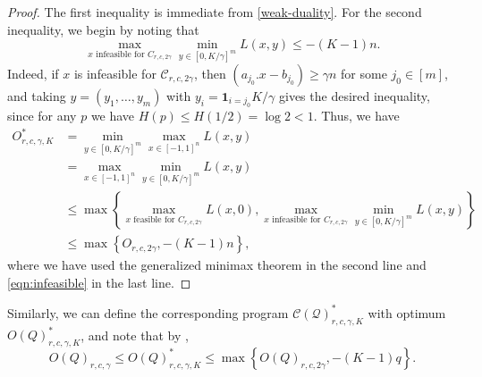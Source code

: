 \documentclass[final, 12pt]{colt2018}
\theoremstyle{definition}
\theoremstyle{plain}
\begin{document}
\begin{proof}
The first inequality is immediate from \cref{weak-duality}. For the second inequality, we begin by noting that  
\begin{equation}
\label{eqn:infeasible}
\max_{x\text{ infeasible for }C_{r,c,2\gamma}}\min_{y\in[0,K/\gamma]^{m}}L(x,y) \leq -(K-1)n.
\end{equation}
Indeed, if $x$ is infeasible for $\mathcal{C}_{r,c,2\gamma}$, then $(a_{j_0}.x - b_{j_0}) \geq \gamma n$ for some $j_0\in[m]$, and taking $y = (y_1,\dots,y_m)$ with $y_i = \textbf{1}_{i=j_0}K/\gamma$ gives the desired inequality, since for any $p$ we have
$H(p) \le H(1/2) = \log 2 < 1$.
Thus, we have
\begin{align*}
O_{r,c,\gamma,K}^{*} & =\min_{y\in[0,K/\gamma]^{m}}\max_{x\in[-1,1]^{n}}L(x,y)\\
 & =\max_{x\in[-1,1]^{n}}\min_{y\in[0,K/\gamma]^{m}}L(x,y)\\
 & \leq\max\left\{ \max_{x\text{ feasible for }C_{r,c,2\gamma}}L(x,0),\max_{x\text{ infeasible for }C_{r,c,2\gamma}}\min_{y\in[0,K/\gamma]^{m}}L(x,y)\right\} \\
 & \leq\max\left\{ O_{r,c,2\gamma},-(K-1)n\right\},
\end{align*}
where we have used the generalized minimax theorem in the second line and \cref{eqn:infeasible} in the last line. 


\end{proof}
Similarly, we can define the corresponding program $\mathcal{C(Q)}^{*}_{r,c,\gamma, K}$ with optimum $O(Q)^{*}_{r,c,\gamma, K}$, and note that by , 
\begin{equation}
\label{eqn:strong-duality-sample}
O(Q)_{r,c,\gamma} \leq O(Q)^{*}_{r,c,\gamma, K} \leq \max\left\{O(Q)_{r,c,2\gamma},-(K-1)q\right\}.
\end{equation}
\end{document}
